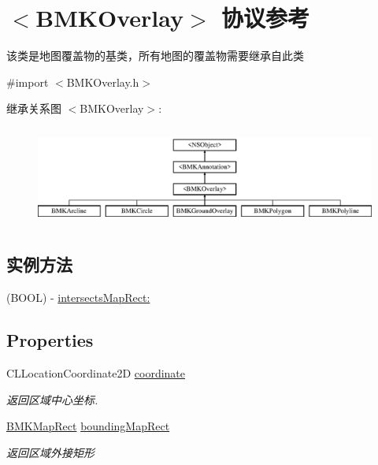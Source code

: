 \hypertarget{protocol_b_m_k_overlay-p}{\section{$<$B\-M\-K\-Overlay$>$ 协议参考}
\label{protocol_b_m_k_overlay-p}
}


该类是地图覆盖物的基类，所有地图的覆盖物需要继承自此类  




{\ttfamily \#import $<$B\-M\-K\-Overlay.\-h$>$}

继承关系图 $<$B\-M\-K\-Overlay$>$\-:\begin{figure}[H]
\begin{center}
\leavevmode
\includegraphics[height=3.318518cm]{protocol_b_m_k_overlay-p}
\end{center}
\end{figure}
\subsection*{实例方法}
\begin{DoxyCompactItemize}
\item 
(B\-O\-O\-L) -\/ \hyperlink{protocol_b_m_k_overlay-p_ad89c522da656c2a977b87bdc1cc4bf21}{intersects\-Map\-Rect\-:}
\end{DoxyCompactItemize}
\subsection*{Properties}
\begin{DoxyCompactItemize}
\item 
\hypertarget{protocol_b_m_k_overlay-p_a7a10d9dde65c9611e3b5279179a9d480}{C\-L\-Location\-Coordinate2\-D \hyperlink{protocol_b_m_k_overlay-p_a7a10d9dde65c9611e3b5279179a9d480}{coordinate}}\label{protocol_b_m_k_overlay-p_a7a10d9dde65c9611e3b5279179a9d480}

\begin{DoxyCompactList}\small\item\em 返回区域中心坐标. \end{DoxyCompactList}\item 
\hypertarget{protocol_b_m_k_overlay-p_a77465daa9e52be51cc5aa15591ab74f0}{\hyperlink{struct_b_m_k_map_rect}{B\-M\-K\-Map\-Rect} \hyperlink{protocol_b_m_k_overlay-p_a77465daa9e52be51cc5aa15591ab74f0}{bounding\-Map\-Rect}}\label{protocol_b_m_k_overlay-p_a77465daa9e52be51cc5aa15591ab74f0}

\begin{DoxyCompactList}\small\item\em 返回区域外接矩形 \end{DoxyCompactList}\end{DoxyCompactItemize}


